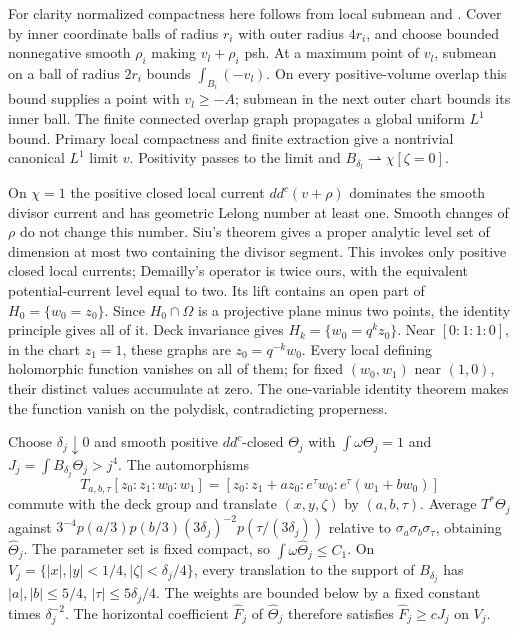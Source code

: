 \documentclass[11pt]{article}
\newcommand{\ddc}{dd^c}
\theoremstyle{remark}\newtheorem{remark}[theorem]{Remark}
\begin{document}
For clarity normalized compactness here follows from local submean and
\cite[I.4.21, I.5.8--5.9]{Dem}. Cover by inner coordinate balls of
radius $r_i$ with outer radius $4r_i$, and choose bounded nonnegative
smooth $\rho_i$ making $v_l+\rho_i$ psh. At a maximum point of $v_l$,
submean on a ball of radius $2r_i$ bounds $\int_{B_i}(-v_l)$.
On every positive-volume overlap this bound supplies a point with
$v_l\geq-A$; submean in the next outer chart bounds its inner ball.
The finite connected overlap graph propagates a global uniform $L^1$
bound. Primary local compactness and finite extraction give a nontrivial
canonical $L^1$ limit $v$. Positivity passes to the limit and
$B_{\delta_l}\rightharpoonup\chi[\zeta=0]$.

On $\chi=1$ the positive closed local current $\ddc(v+\rho)$ dominates
the smooth divisor current and has geometric Lelong number at least one.
Smooth changes of $\rho$ do not change this number. Siu's theorem
\cite[III.8.5]{Dem} gives a proper analytic level set of dimension at most
two containing the divisor segment. This invokes only positive closed
local currents; Demailly's operator is twice ours, with the equivalent
potential-current level equal to two. Its lift contains an open part
of $H_0=\{w_0=z_0\}$. Since $H_0\cap\Omega$ is a projective plane
minus two points, the identity principle gives all of it. Deck invariance
gives $H_k=\{w_0=q^kz_0\}$. Near $[0:1:1:0]$, in the chart $z_1=1$,
these graphs are $z_0=q^{-k}w_0$. Every local defining holomorphic
function vanishes on all of them; for fixed $(w_0,w_1)$ near $(1,0)$,
their distinct values accumulate at zero. The one-variable identity
theorem makes the function vanish on the polydisk, contradicting properness.

Choose $\delta_j\downarrow0$ and smooth positive $\ddc$-closed $\Theta_j$
with $\int\omega\Theta_j=1$ and $J_j=\int B_{\delta_j}\Theta_j>j^4$.
The automorphisms
\[
 T_{a,b,\tau}[z_0:z_1:w_0:w_1]
 =[z_0:z_1+az_0:e^\tau w_0:e^\tau(w_1+bw_0)]
\]
commute with the deck group and translate $(x,y,\zeta)$ by $(a,b,\tau)$.
Average $T^*\Theta_j$ against
$3^{-4}p(a/3)p(b/3)(3\delta_j)^{-2}p(\tau/(3\delta_j))$
relative to $\sigma_a\sigma_b\sigma_\tau$, obtaining $\widehat\Theta_j$.
The parameter set is fixed compact, so $\int\omega\widehat\Theta_j\leq C_1$.
On $V_j=\{|x|,|y|<1/4,|\zeta|<\delta_j/4\}$, every translation to
the support of $B_{\delta_j}$ has $|a|,|b|\leq5/4$,
$|\tau|\leq5\delta_j/4$. The weights are bounded below by a fixed
constant times $\delta_j^{-2}$. The horizontal coefficient
$\widehat F_j$ of $\widehat\Theta_j$ therefore satisfies
$\widehat F_j\geq cJ_j$ on $V_j$.
\end{document}
